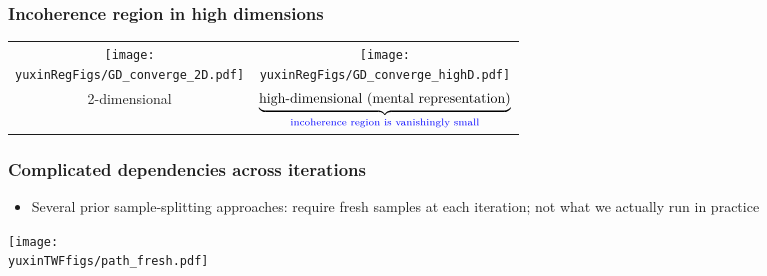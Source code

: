 \documentclass[compress,
mathserif,wide,%
]{beamer}
\newcommand{\yuxinTWFfigs}{figure}
\newcommand{\yuxinRegFigs}{figure}
\begin{document}
\begin{frame}
	\frametitle{Incoherence region in high dimensions}

\begin{center}
\begin{tabular}{cc}
 \texttt{[image: \\yuxinRegFigs/GD\_converge\_2D.pdf]}& \texttt{[image: \\yuxinRegFigs/GD\_converge\_highD.pdf]}\tabularnewline
 2-dimensional & $\underset{\textcolor{blue}{ \text{incoherence region is vanishingly small}}}{\underbrace{\text{high-dimensional (mental representation)}}}$ \tabularnewline
\end{tabular}
%
\end{center}
\end{frame}



\begin{frame}[plain]
\frametitle{Complicated dependencies across iterations}

\begin{itemize}
  \item Several prior sample-splitting approaches: require \alert{fresh samples} at each iteration; not what  we actually run in practice 
\end{itemize}
  \begin{center}
     \texttt{[image: \\yuxinTWFfigs/path\_fresh.pdf]} 
  \end{center}



\end{frame}
\end{document}
